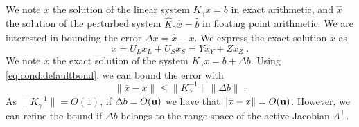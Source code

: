 We note $x$ the solution of the linear system $K_\gamma x = b$
in exact arithmetic, and $\widehat{x}$ the solution of
the perturbed system $\widehat{K}_\gamma \widehat{x} = \widehat{b}$
in floating point arithmetic. We are interested in bounding
the error $\Delta x = \widehat{x} - x$. We express
the exact solution $x$ as
\begin{equation}
  x = U_L x_L + U_S x_S = Y x_Y + Z x_Z \; .
\end{equation}
We note $\bar{x}$ the exact solution of the system
$K_\gamma \bar{x} = b + \Delta b$. Using \eqref{eq:cond:defaultbond},
we can bound the error with
\begin{equation}
  \| \bar{x} - x\| \leq \| K_\gamma^{-1} \| \|\Delta b \| \; .
\end{equation}
As $\| K_\gamma^{-1}\| = \Theta(1)$, if $\Delta b = O(\mathbf{u})$ we have that
$\| \bar{x} - x \| = O(\mathbf{u})$. However, we can
refine the bound if $\Delta b$ belongs to the range-space
of the active Jacobian $A^\top$.

